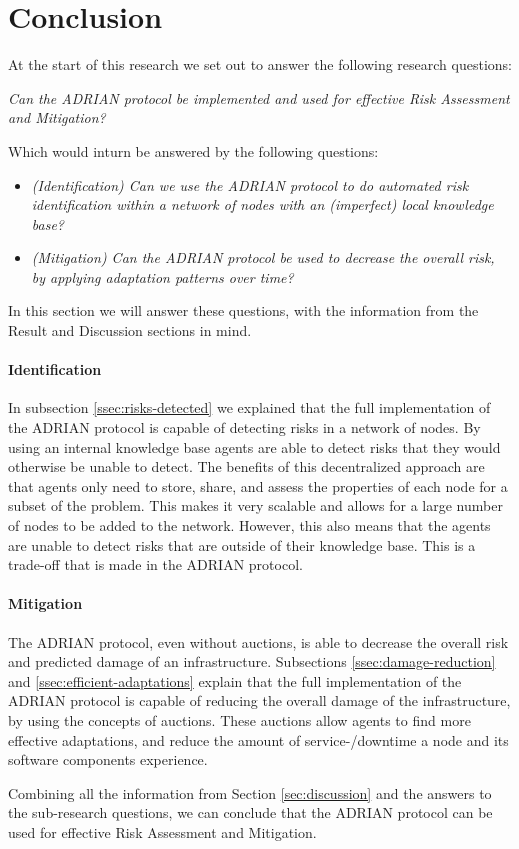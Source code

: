 \section{Conclusion}
\label{sec:conclusion}

At the start of this research we set out to answer the following research questions:

\vspace{0.5em}
\emph{Can the ADRIAN protocol be implemented and used for effective Risk Assessment and Mitigation?}
\vspace{0.5em}

Which would inturn be answered by the following questions: 
\begin{itemize}
    \item \textit{(Identification) Can we use the ADRIAN protocol to do automated risk identification within a network of nodes with an (imperfect) local knowledge base?}
    \item \textit{(Mitigation) Can the ADRIAN protocol be used to decrease the overall risk, by applying adaptation patterns over time?}
\end{itemize}

In this section we will answer these questions, with the information from the Result and Discussion sections in mind.


\paragraph*{Identification}
In subsection \ref{ssec:risks-detected} we explained that the full implementation of the ADRIAN protocol is capable of detecting risks in a network of nodes. By using an internal knowledge base agents are able to detect risks that they would otherwise be unable to detect. The benefits of this decentralized approach are that agents only need to store, share, and assess the properties of each node for a subset of the problem. This makes it very scalable and allows for a large number of nodes to be added to the network. However, this also means that the agents are unable to detect risks that are outside of their knowledge base. This is a trade-off that is made in the ADRIAN protocol. 

\paragraph*{Mitigation}
The ADRIAN protocol, even without auctions, is able to decrease the overall risk and predicted damage of an infrastructure.
Subsections \ref{ssec:damage-reduction} and \ref{ssec:efficient-adaptations} explain that the full implementation of the ADRIAN protocol is capable of reducing the overall damage of the infrastructure, by using the concepts of auctions. These auctions allow agents to find more effective adaptations, and reduce the amount of service-/downtime a node and its software components experience. 


\vspace{0.5em}
Combining all the information from Section \ref{sec:discussion} and the answers to the sub-research questions, we can conclude that the ADRIAN protocol can be used for effective Risk Assessment and Mitigation. 
